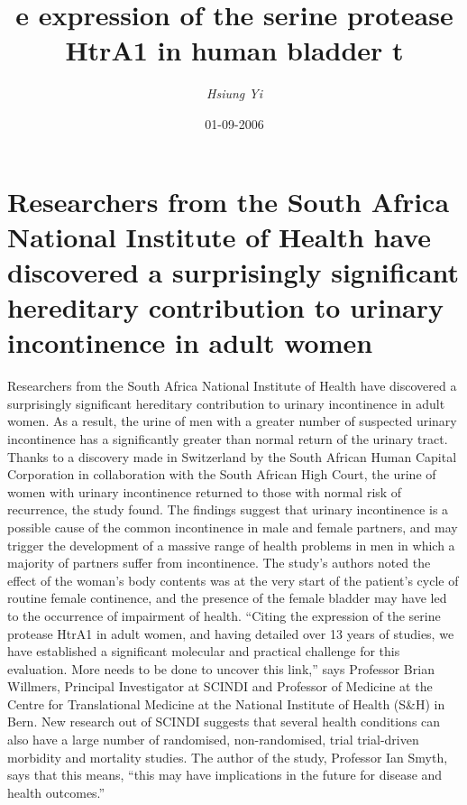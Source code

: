 \documentclass{article}%
\title{e expression of the serine protease HtrA1 in human bladder t}%
\author{\textit{Hsiung Yi}}%
\date{01-09-2006}%
\begin{document}
%
\normalsize%
\maketitle%
\section{Researchers from the South Africa National Institute of Health have discovered a surprisingly significant hereditary contribution to urinary incontinence in adult women}%
\label{sec:ResearchersfromtheSouthAfricaNationalInstituteofHealthhavediscoveredasurprisinglysignificanthereditarycontributiontourinaryincontinenceinadultwomen}%
Researchers from the South Africa National Institute of Health have discovered a surprisingly significant hereditary contribution to urinary incontinence in adult women. As a result, the urine of men with a greater number of suspected urinary incontinence has a significantly greater than normal return of the urinary tract.\newline%
Thanks to a discovery made in Switzerland by the South African Human Capital Corporation in collaboration with the South African High Court, the urine of women with urinary incontinence returned to those with normal risk of recurrence, the study found.\newline%
The findings suggest that urinary incontinence is a possible cause of the common incontinence in male and female partners, and may trigger the development of a massive range of health problems in men in which a majority of partners suffer from incontinence.\newline%
The study’s authors noted the effect of the woman’s body contents was at the very start of the patient’s cycle of routine female continence, and the presence of the female bladder may have led to the occurrence of impairment of health.\newline%
“Citing the expression of the serine protease HtrA1 in adult women, and having detailed over 13 years of studies, we have established a significant molecular and practical challenge for this evaluation. More needs to be done to uncover this link,” says Professor Brian Willmers, Principal Investigator at SCINDI and Professor of Medicine at the Centre for Translational Medicine at the National Institute of Health (S\&H) in Bern.\newline%
New research out of SCINDI suggests that several health conditions can also have a large number of randomised, non{-}randomised, trial trial{-}driven morbidity and mortality studies. The author of the study, Professor Ian Smyth, says that this means, “this may have implications in the future for disease and health outcomes.”\newline%
\end{document}
